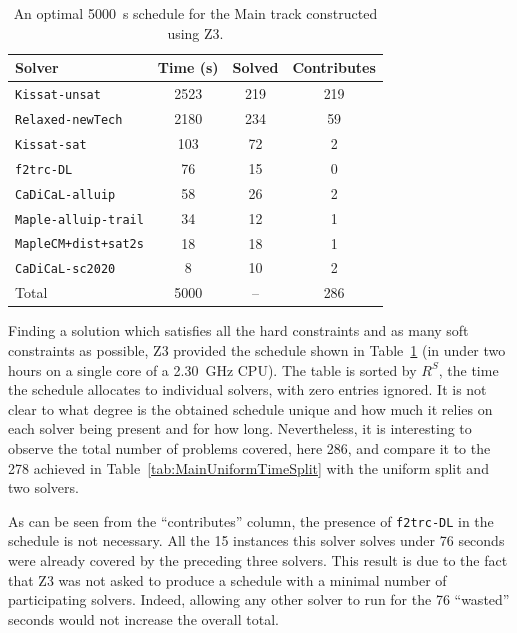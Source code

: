 \documentclass{elsarticle}
\newcommand{\solver}[1]{\texttt{#1}}
\begin{document}
\begin{table}
\centering\small
\begin{tabularx}{\linewidth}{Xccc}
\bf Solver & \bf Time (s) & \bf Solved & \bf Contributes \\
\hline\arrayrulecolor{lightgray}
\solver{Kissat-unsat} & 2523 & 219 & 219 \\
\solver{Relaxed-newTech} & 2180 & 234 & \phantom{0}59 \\
\solver{Kissat-sat} & \phantom{0}103 & \phantom{0}72 & \phantom{00}2 \\
\solver{f2trc-DL} & \phantom{00}76 & \phantom{0}15 & \phantom{00}0 \\
\solver{CaDiCaL-alluip} & \phantom{00}58 & \phantom{0}26 & \phantom{00}2 \\
\solver{Maple-alluip-trail} & \phantom{00}34 & \phantom{0}12 & \phantom{00}1 \\
\solver{MapleCM+dist+sat2s} & \phantom{00}18 & \phantom{0}18 & \phantom{00}1 \\
\solver{CaDiCaL-sc2020} & \phantom{000}8 & \phantom{0}10 & \phantom{00}2 \\
\hline 
Total & 5000 & \phantom{0}-- & 286 \\ 
\end{tabularx}
\caption{An optimal \SI{5000}{\second} schedule for the Main track
constructed using Z3.}
\label{tab:MainZ3Schedule}
\end{table}

Finding a solution which satisfies all the hard constraints and as many soft constraints as possible,
Z3 provided  the schedule shown in Table~\ref{tab:MainZ3Schedule} (in under two hours on a single core of a \SI{2.30}{\giga\hertz} CPU).
The table is sorted by $R^S$, the time the schedule allocates to individual solvers, with zero entries ignored.
It is not clear to what degree is the obtained schedule unique and how much it relies on each solver being present and for how long.
Nevertheless, it is interesting to observe the total number of problems covered, here 286,
and compare it to the 278 achieved in Table~\ref{tab:MainUniformTimeSplit} with the uniform split and two solvers.

As can be seen from the ``contributes'' column, the presence of \solver{f2trc-DL} in the schedule is not necessary.
All the 15 instances this solver solves under 76 seconds were already covered by the preceding three solvers.
This result is due to the fact that Z3 was not asked to produce a schedule with a minimal number of
participating solvers.
Indeed, allowing any other solver to run for the 76 ``wasted'' seconds would not increase the overall total.
\end{document}
